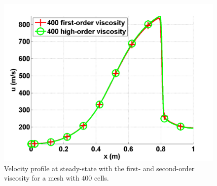 \begin{figure}[H]
\centering
\includegraphics[scale=.50]{figures/vapor_velocity_fo_and_ev_400.png}
\caption{Velocity profile at steady-state with the first- and second-order viscosity for a mesh with $400$ cells.}
\label{fig:1d_nozzle_vap_fo_ev}
\end{figure}
